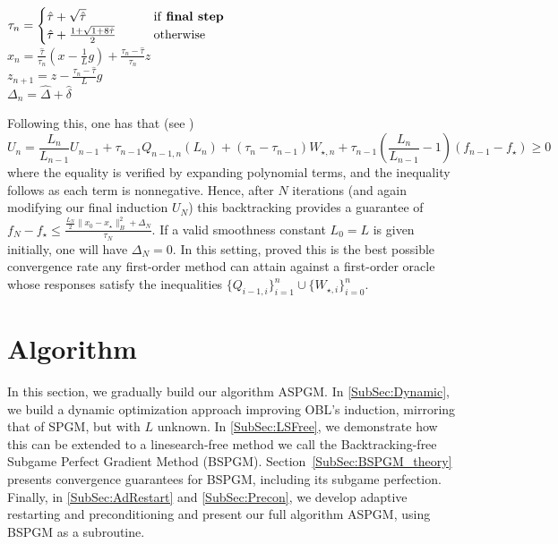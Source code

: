 \documentclass[11pt]{article}
\numberwithin{equation}{section}
\newcommand{\normB}[1]{\|{#1}\|_B}
\theoremstyle{definition}
\theoremstyle{plain}
\theoremstyle{definition}
\begin{document}
\begin{algorithm}
    \caption{OBL Update Procedure} \label{Alg:OBLUpdate}
        {
        $\tau_n = \begin{cases} 
            \hat{\tau} + \sqrt{\hat{\tau}} \qquad & \text{if \textbf{final step}} \\
            \hat{\tau} + \frac{1 + \sqrt{1+8\hat{\tau}}}{2} \qquad & \text{otherwise}
            \end{cases}$ \\
        $x_n = \frac{\hat{\tau}}{\tau_n} (x - \frac{1}{L} g) + \frac{\tau_n - \hat{\tau}}{\tau_n}z$\\
        $z_{n+1} = z - \frac{\tau_{n}-\hat{\tau}}{L}g$ \\
        $\Delta_n = \hat{\Delta} + \hat{\delta}$
        }
\end{algorithm}
Following this, one has that (see \cite[Theorem 6]{OBL})
\begin{equation*}
    U_n = \frac{L_n}{L_{n-1}} U_{n-1} + \tau_{n-1} Q_{n-1,n}(L_n) + (\tau_n - \tau_{n-1}) W_{\star, n} + \tau_{n-1}\left(\frac{L_n}{L_{n-1}} - 1 \right) (f_{n-1} - f_\star) \geq 0
\end{equation*}
where the equality is verified by expanding polynomial terms, and the inequality follows as each term is nonnegative. Hence, after $N$ iterations (and again modifying our final induction $U_N$) this backtracking provides a guarantee of
$ f_N - f_\star \leq \frac{\frac{L_N}{2}\normB{x_0-x_\star}^2 + \Delta_N}{\tau_N}$.
If a valid smoothness constant $L_0 = L$ is given initially, one will have $\Delta_N=0$. In this setting, \cite{OBL} proved this is the best possible convergence rate any first-order method can attain against a first-order oracle whose responses satisfy the inequalities $\{Q_{i-1,i}\}_{i = 1}^n \cup \{W_{\star, i}\}_{i=0}^n$.


\section{Algorithm} \label{Sec:Algorithm}

In this section, we gradually build our algorithm ASPGM. In \cref{SubSec:Dynamic}, we build a dynamic optimization approach improving OBL's induction, mirroring that of SPGM, but with $L$ unknown. In \cref{SubSec:LSFree}, we demonstrate how this can be extended to a linesearch-free method we call the Backtracking-free Subgame Perfect Gradient Method (BSPGM). Section~\ref{SubSec:BSPGM_theory} presents convergence guarantees for BSPGM, including its subgame perfection. Finally, in \cref{SubSec:AdRestart} and \cref{SubSec:Precon}, we develop adaptive restarting and preconditioning and present our full algorithm ASPGM, using BSPGM as a subroutine.
\end{document}
